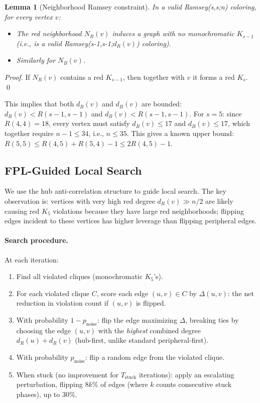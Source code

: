 \documentclass[11pt]{article}
\newtheorem{lemma}[theorem]{Lemma}
\begin{document}
\begin{lemma}[Neighborhood Ramsey constraint]
In a valid Ramsey(s,s;n) coloring, for every vertex $v$:
\begin{itemize}
\item The red neighborhood $N_R(v)$ induces a graph with no monochromatic $K_{s-1}$
(i.e., is a valid Ramsey(s-1,s-1;$d_R(v)$) coloring).
\item Similarly for $N_B(v)$.
\end{itemize}
\end{lemma}

\begin{proof}
If $N_R(v)$ contains a red $K_{s-1}$, then together with $v$ it forms a
red $K_s$. \qed
\end{proof}

This implies that both $d_R(v)$ and $d_B(v)$ are bounded:
$d_R(v) < R(s-1,s-1)$ and $d_B(v) < R(s-1,s-1)$.
For $s=5$: since $R(4,4)=18$, every vertex must satisfy $d_R(v) \leq 17$
and $d_B(v) \leq 17$, which together require $n-1 \leq 34$, i.e., $n \leq 35$.
This gives a known upper bound: $R(5,5) \leq R(4,5) + R(5,4) - 1 \leq 2R(4,5)-1$.

\subsection{FPL-Guided Local Search}

We use the hub anti-correlation structure to guide local search.
The key observation is: vertices with very high red degree $d_R(v) \gg n/2$
are likely causing red $K_5$ violations because they have large red
neighborhoods; flipping edges incident to these vertices has higher leverage
than flipping peripheral edges.

\paragraph{Search procedure.}
At each iteration:
\begin{enumerate}
\item Find all violated cliques (monochromatic $K_5$'s).
\item For each violated clique $C$, score each edge $(u,v) \in C$ by
$\Delta(u,v)$: the net reduction in violation count if $(u,v)$ is flipped.
\item With probability $1-p_{\text{noise}}$: flip the edge maximizing $\Delta$,
breaking ties by choosing the edge $(u,v)$ with the \emph{highest}
combined degree $d_R(u)+d_R(v)$ (hub-first, unlike standard peripheral-first).
\item With probability $p_{\text{noise}}$: flip a random edge from the violated clique.
\item When stuck (no improvement for $T_{\text{stuck}}$ iterations): apply
an escalating perturbation, flipping $8k\%$ of edges (where $k$ counts
consecutive stuck phases), up to 30\%.
\end{enumerate}
\end{document}
